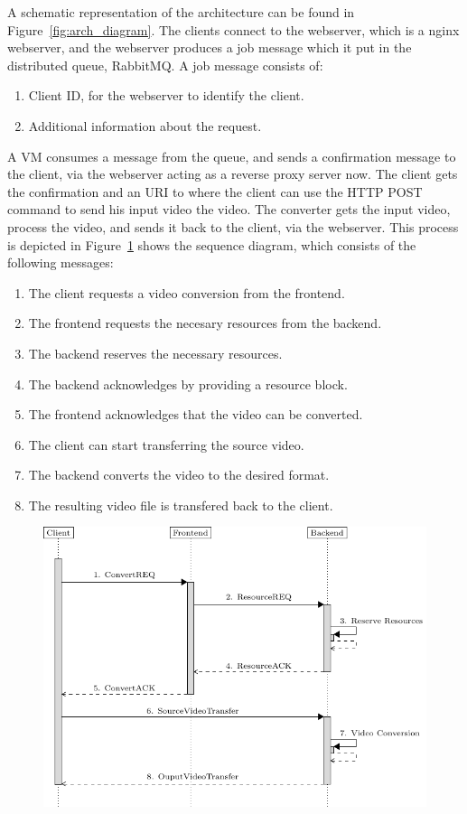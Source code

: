 \documentclass[]{article}
\begin{document}
A schematic representation of the architecture can be found in
Figure~\ref{fig:arch_diagram}. The clients connect to the webserver,
which is a nginx webserver, and the webserver produces a job message which it
put in the distributed queue, RabbitMQ. A job message consists of:
\begin{enumerate}
\item Client ID, for the webserver to identify the client.
\item Additional information about the request.
\end{enumerate}
A VM consumes a message from the queue, and sends a confirmation
message to the client, via the webserver acting as a reverse proxy
server now. The client gets the confirmation and an URI to where the
client can use the HTTP POST command to send his input video the
video. The converter gets the input video, process the video, and
sends it back to the client, via the webserver. This process is
depicted in Figure~\ref{fig:sequence_diagram} shows the sequence
diagram, which consists of the following messages:
\begin{enumerate}
\item The client requests a video conversion from the frontend.
\item The frontend requests the necesary resources from the backend.
\item The backend reserves the necessary resources.
\item The backend acknowledges by providing a resource block.
\item The frontend acknowledges that the video can be converted.
\item The client can start transferring the source video.
\item The backend converts the video to the desired format.
\item The resulting video file is transfered back to the client.
\end{enumerate}

\begin{figure}[h]
  \centering
  \includegraphics[width=\linewidth]{sequence_diagram}
  \caption{}
  \label{fig:sequence_diagram}
\end{figure}
\end{document}
